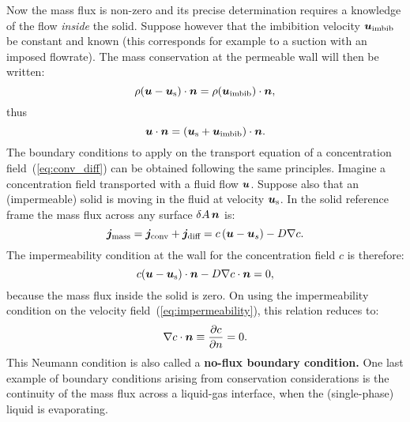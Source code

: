 Now the mass flux is non-zero and its precise determination requires a knowledge of the flow \textit{inside} the solid. Suppose however that the imbibition velocity $\bu_\text{imbib}$ be constant and known (this corresponds for example to a suction with an imposed flowrate). The mass conservation at the permeable wall will then be written:
\begin{equation}
\rho (\bu-\bu_\text s) \cdot \bn = \rho (\bu_\text{imbib}) \cdot \bn,
\end{equation}
thus 
\begin{equation}
\bu\cdot\bn = \lp\bu_\text s + \bu_\text{imbib}\rp\cdot\bn.
\end{equation}
The boundary conditions to apply on the transport equation of a concentration field~(\ref{eq:conv_diff}) can be obtained following the same principles. Imagine a concentration field transported with a fluid flow $\bu$. Suppose also that an (impermeable) solid is moving in the fluid at velocity $\bu_\text s$. In the solid reference frame the mass flux across any surface $\delA \,\bn$ is:
\begin{equation}
\bj_\text{mass} = \bj_\text{conv} + \bj_\text{diff} = c \lp \bu - \bu_s\rp - D \nabla c.
\end{equation}
The impermeability condition at the wall for the concentration field $c$ is therefore:
\begin{equation}
c (\bu-\bu_\text s) \cdot \bn - D \nabla c \cdot \bn = 0,
\end{equation}
because the mass flux inside the solid is zero.
On using the impermeability condition on the velocity field~(\ref{eq:impermeability}), this relation reduces to:
\begin{equation}
\nabla c \cdot \bn \equiv \pd{c}{n} = 0.
\end{equation}
This Neumann condition is also called a \textbf{no-flux boundary condition.}
 One last example of boundary conditions arising from conservation considerations is the continuity of the mass flux across a liquid-gas interface, when the (single-phase) liquid is evaporating.

